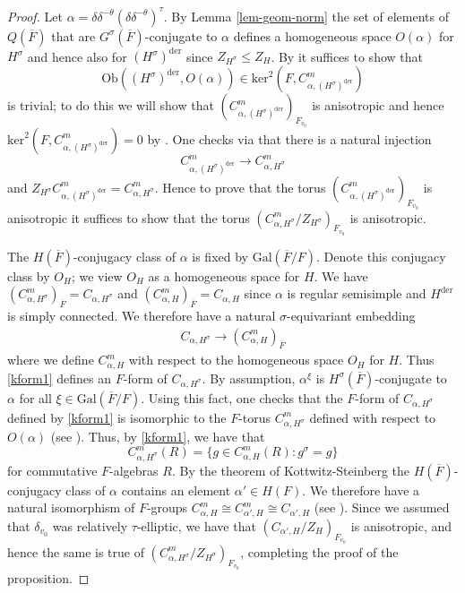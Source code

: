 \documentclass[12pt]{amsart}
\theoremstyle{remark}
\numberwithin{equation}{section}
\newcommand{\Gal}{\mathrm{Gal}}
\newcommand{\lto}{\longrightarrow}
\theoremstyle{definition}
\renewcommand{\bar}{\overline}
\numberwithin{equation}{subsection}
\begin{document}
\begin{proof}
Let $\alpha=\delta\delta^{-\theta}(\delta\delta^{-\theta})^{\tau}$.  By Lemma \ref{lem-geom-norm} the set of elements of $Q(\bar{F})$ that are $G^{\sigma}(\bar{F})$-conjugate to $\alpha$ defines a homogeneous space $O(\alpha)$ for $H^{\sigma}$ and hence also for $(H^{\sigma})^{\mathrm{der}}$ since $Z_{H^{\sigma}} \leq Z_H$.
By \cite[Theorem 1.6]{BorHasse} it suffices to show that
$$
\mathrm{Ob}((H^{\sigma})^{\mathrm{der}},O(\alpha)) \in \mathrm{ker}^2(F,C_{\alpha,(H^{\sigma})^{\mathrm{der}}}^m)
$$
is trivial; to do this we will show that $(C_{\alpha,(H^{\sigma})^{\mathrm{der}}}^m)_{F_{v_0}}$ is anisotropic and hence
$\mathrm{ker}^2(F,C_{\alpha,(H^{\sigma})^{\mathrm{der}}}^m)=0$ by \cite[Lemme 1.9]{Sansuc}.
One checks via \cite[\S 1.7]{BorHasse} that there is a natural injection
$$
C_{\alpha,(H^{\sigma})^{\mathrm{der}}}^m \lto C_{\alpha,H^{\sigma}}^m
$$
and $Z_{H^{\sigma}}C_{\alpha,(H^{\sigma})^{\mathrm{der}}}^m = C_{\alpha,H^{\sigma}}^m$.
Hence to prove that the torus $(C_{\alpha,(H^{\sigma})^{\mathrm{der}}}^m)_{F_{v_0}}$ is anisotropic it suffices to show that the torus $(C_{\alpha,H^{\sigma}}^m/Z_{H^{\sigma}})_{F_{v_0}}$ is anisotropic.

The $H(\bar{F})$-conjugacy class of $\alpha$ is fixed by $\Gal(\bar{F}/F)$.
  Denote this conjugacy class by $O_{H}$; we view $O_{H}$ as a homogeneous space for $H$. We have
$(C_{\alpha,H^{\sigma}}^m)_{\bar{F}}=C_{\alpha,H^{\sigma}}$ and $(C_{\alpha,H}^m)_{\bar{F}}=C_{\alpha,H}$ since $\alpha$ is regular semisimple
and $H^{\mathrm{der}}$ is simply connected.  We therefore have a natural $\sigma$-equivariant embedding
  \begin{align} \label{kform1}
  C_{\alpha,H^{\sigma}} \to (C_{\alpha,H}^m)_{\bar{F}}
  \end{align}
  where we define $C_{\alpha,H}^m$ with
  respect to the homogeneous space $O_{H}$ for $H$.
  Thus \eqref{kform1} defines an $F$-form of
  $C_{\alpha,H^{\sigma}}$.
By assumption, $\alpha^{\xi}$ is $H^{\sigma}(\bar{F})$-conjugate
    to $\alpha$ for all $\xi \in \Gal(\bar{F}/F)$.
    Using this fact, one checks that the $F$-form of
    $C_{\alpha,H^{\sigma}}$
    defined by \eqref{kform1} is isomorphic to the
    $F$-torus $C_{\alpha,H^{\sigma}}^m$ defined with respect to
    $O(\alpha)$ (see \cite[\S 1.7]{BorHasse}).  Thus, by \eqref{kform1}, we have that
  $$
  C_{\alpha,H^{\sigma}}^m(R)=\{g \in C_{\alpha,H}^m(R): g^{\sigma}=g\}
  $$
  for commutative $F$-algebras $R$.
By the theorem of Kottwitz-Steinberg \cite[Theorem 4.1]{KottRatConj} the $H(\bar{F})$-conjugacy class of $\alpha$ contains an element $\alpha' \in H(F)$.  We
therefore have a natural isomorphism of $F$-groups $C_{\alpha,H}^m \cong C_{\alpha',H}^m \cong
C_{\alpha',H}$
(see \cite[\S 1.7]{BorHasse}).  Since we assumed that $\delta_{v_0}$ was relatively $\tau$-elliptic, we have that $(C_{\alpha',H}/Z_{H})_{F_{v_0}}$ is anisotropic, and hence the same is true of $(C_{\alpha,H^{\sigma}}^m/Z_{H^{\sigma}})_{F_{v_0}}$, completing the proof of the proposition.


\end{proof}
\end{document}
